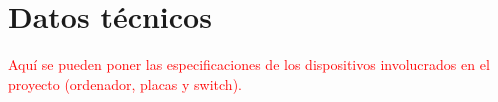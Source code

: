 \chapter{Datos técnicos}
\textcolor{red}{Aquí se pueden poner las especificaciones de los dispositivos involucrados en el proyecto (ordenador, placas y switch).}